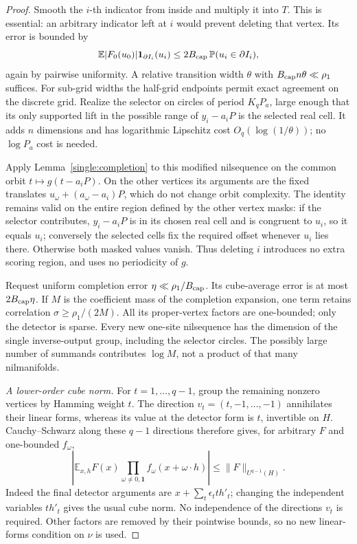 \documentclass[11pt,a4paper]{article}
\theoremstyle{definition}
\newcommand{\E}{\mathbb E}
\newcommand{\one}{\mathbf 1}
\begin{document}
\begin{proof}
Smooth the \(i\)-th indicator from inside and multiply it into
\(T\). This is essential: an arbitrary indicator left at \(i\)
would prevent deleting that vertex. Its error is bounded by
\[
 \E|F_0(u_0)|\one_{\partial I_i}(u_i)
 \le2B_{\rm cap}\,\mathbb P(u_i\in\partial I_i),
\]
again by pairwise uniformity. A relative transition width
\(\theta\) with \(B_{\rm cap} n\theta\ll\rho_1\) suffices. For
sub-grid widths the half-grid endpoints permit exact agreement
on the discrete grid. Realize the selector on circles of period
\(K_qP_a\), large enough that its only supported lift in the
possible range of \(y_i-a_iP\) is the selected real cell.
It adds \(n\) dimensions and has logarithmic Lipschitz cost
\(O_q(\log(1/\theta))\); no \(\log P_a\) cost is needed.

Apply Lemma~\ref{single:completion} to this modified nilsequence
on the common orbit \(t\mapsto g(t-a_iP)\). On the other
vertices its arguments are the fixed translates
\(u_\omega+(a_\omega-a_i)P\), which do not change orbit
complexity. The identity remains valid on the entire region
defined by the other vertex masks: if the selector contributes,
\(y_i-a_iP\) is in its chosen real cell and is congruent to
\(u_i\), so it equals \(u_i\); conversely the selected cells
fix the required offset whenever \(u_i\) lies there. Otherwise
both masked values vanish. Thus deleting \(i\) introduces no
extra scoring region, and uses no periodicity of \(g\).

Request uniform completion error \(\eta\ll\rho_1/B_{\rm cap}\).
Its cube-average error is at most \(2B_{\rm cap}\eta\). If \(M\)
is the coefficient mass of the completion expansion, one term
retains correlation \(\sigma\ge\rho_1/(2M)\). All its
proper-vertex factors are one-bounded; only the detector is
sparse. Every new one-site nilsequence has the dimension of the
single inverse-output group, including the selector circles.
The possibly large number of summands contributes \(\log M\),
not a product of that many nilmanifolds.

\textit{A lower-order cube norm.}
For \(t=1,\ldots,q-1\), group the remaining nonzero vertices
by Hamming weight \(t\). The direction
\(v_t=(t,-1,\ldots,-1)\) annihilates their linear forms,
whereas its value at the detector form is \(t\), invertible
on \(H\). Cauchy--Schwarz along these \(q-1\) directions
therefore gives, for arbitrary \(F\) and one-bounded \(f_\omega\),
\[
 \left|\E_{x,h}F(x)
   \prod_{\omega\ne0,\mathbf1}f_\omega(x+\omega\cdot h)\right|
 \le\|F\|_{U^{q-1}(H)}.
\]
Indeed the final detector arguments are
\(x+\sum_t\epsilon_t t h'_t\); changing the independent
variables \(t h'_t\) gives the usual cube norm. No independence
of the directions \(v_t\) is required. Other factors are removed
by their pointwise bounds, so no new linear-forms condition on
\(\nu\) is used.


\end{proof}
\end{document}
